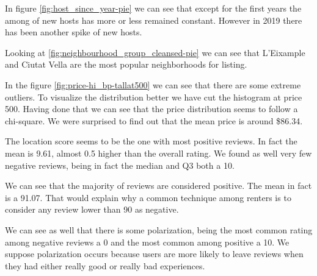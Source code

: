 In figure \ref{fig:host_since_year-pie} we can see that except for the first years the among of new hosts has more or less remained constant. However 
in 2019 there has been another spike of new hosts.




Looking at \ref{fig:neighbourhood_group_cleansed-pie} we can see that L'Eixample
and Ciutat Vella are the most popular neighborhoods for listing.


In the figure \ref{fig:price-hi_bp-tallat500} we can see that there are some extreme outliers. To visualize the distribution better we have cut the histogram at price 500. Having done that we can see that the price distribution seems to follow a chi-square. We were surprised to find out that the mean price is 
around \$86.34.




The location score seems to be the one with most positive reviews. In fact the mean is 9.61, almost 0.5 higher than the overall rating. We found as well
very few negative reviews, being in fact the median and Q3 both a 10.



We can see that the majority of reviews are considered positive. The mean in fact is 
a 91.07. That would explain why a common technique among renters is to consider 
any review lower than 90 as negative. 

We can see as well that there is some polarization, being the most common rating among 
negative reviews a 0 and the most common among positive a 10. We suppose polarization occurs
because users are more likely to leave reviews when they had either really good or 
really bad experiences.


